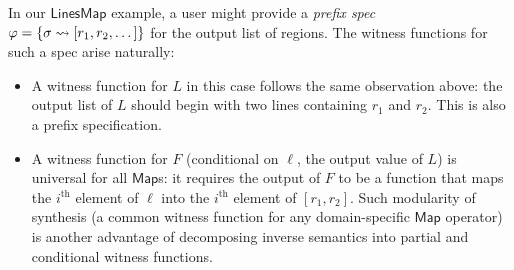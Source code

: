 In our $\mathsf{LinesMap}$ example, a user might provide a \emph{prefix spec} \mbox{$\varphi = \{ \sigma
\rightsquigarrow [r_1, r_2, \dots] \}$} for the output list of regions.
The witness functions for such a spec arise naturally:
\begin{itemize}
    \item A witness function for $L$ in this case follows the same observation above: the output list of $L$ should
        begin with two lines containing $r_1$ and $r_2$.
        This is also a prefix specification.
    \item A witness function for $F$ (conditional on $\ell$, the output value of $L$) is universal for all
        $\mathsf{Map}$s: it requires the output of $F$ to be a function that maps the $i^{\text{th}}$ element of $\ell$
        into the $i^{\text{th}}$ element of $[r_1, r_2]$.
        Such modularity of synthesis (a common witness function for any domain-specific $\mathsf{Map}$ operator) is
        another advantage of decomposing inverse semantics into partial and conditional witness functions.
\end{itemize}

